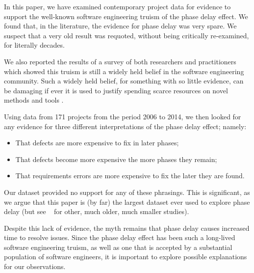 \documentclass{sig-alternate}
\newcommand{\bi}{\begin{itemize}}%
\newcommand{\ei}{\end{itemize}}
\begin{document}
In this paper, we have examined contemporary project data for evidence to support the well-known software engineering truism of the phase delay effect. 
We found that, in the literature, the evidence for phase delay was very spare.
We suspect that a very old result was requoted, without being 
critically re-examined, for literally decades.

We  also  reported the results of a survey of both researchers and practitioners which showed this truism is still a widely held belief in the software engineering community. Such a widely
held belief, for something with so little evidence, can be damaging if ever it is used
to justify spending scarce resources on novel  methods and tools .

Using data from 171 projects from the period 2006 to 2014, we then looked for any evidence
for three different interpretations of the phase delay effect; namely:
\bi
\item
That defects are more expensive to fix in later phases; 
\item
That defects become more expensive the more phases they remain; 
\item
That requirements errors are more expensive to fix the later they are found. 
\ei
Our dataset provided no support for any of these phrasings. 
This is significant, as we argue that this paper is (by far)    the largest dataset ever used to explore phase delay (but see ~\cite{Boehm80,Clutterbuck09,Shull02,Royce98} 
for other, much older, much smaller studies).


 


Despite this lack of evidence, the myth remains that phase delay causes increased time to resolve issues.
 Since the phase delay effect has been such a long-lived software engineering truism, as well as one that is accepted by a substantial population of software engineers, it is important to explore possible explanations for our observations.
 
\end{document}
